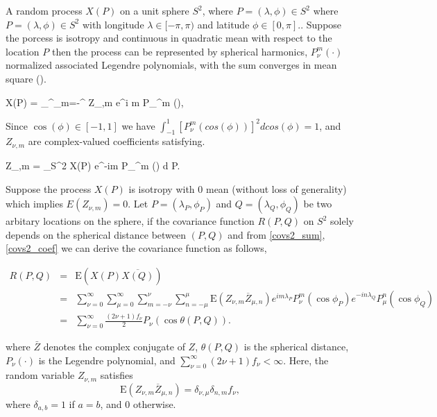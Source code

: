 	A random process $X(P)$ on a unit sphere $S^2$, where $P=(\lambda, \phi) \in S^2$ where $P=(\lambda, \phi) \in S^2$ with longitude $\lambda \in [-\pi, \pi)$ and latitude $\phi \in [0, \pi]$.. Suppose the porcess is isotropy and continuous in quadratic mean with respect to the location $P$ then the process can be represented by spherical harmonics, $P_{\nu}^m(\cdot)$ normalized associated Legendre polynomials, with the sum converges in mean square (\cite{LiNorth1997, Huang2012}).   
		
		\beq
		X(P) = \sum_{}^\infty \sum_{m=-\nu}^{\nu} Z_{\nu,m} e^{i m \lambda} P_{\nu}^m (\cos \phi),
		\eeq
		
		Since $\cos(\phi)\in[-1,1]$ we have $\int_{-1}^{1}[P_{\nu}^m(cos(\phi))]^2dcos(\phi) = 1$, and $Z_{\nu,m}$ are complex-valued coefficients satisfying.
		
		\beq
		Z_{\nu,m} = \int_{S^2} X(P) e^{-im \lambda} P_{\nu}^m (\cos \phi) d P.
		\eeq
			
		Suppose the process $X(P)$ is isotropy with 0 mean (without loss of generality) which implies $E(Z_{\nu,m}) = 0$. Let $P = (\lambda_P, \phi_P)$ and $Q=(\lambda_Q, \phi_Q)$ be two arbitary locations on the sphere, if the covariance function $R(P,Q)$ on $S^2$ solely depends on the spherical distance between $(P,Q)$ and from \ref{covs2_sum}, \ref{covs2_coef} we can derive the covariance function as follows,
			
		\begin{eqnarray} \label{rpq_1}
			R(P, Q) &=& \mbox{E}(X(P) \overline{X(Q)}) \nonumber \\
			&=& \sum_{\nu=0}^\infty \sum_{\mu=0}^\infty \sum_{m=-\nu}^{\nu} \sum_{n=-\mu}^{\mu} \mbox{E}(Z_{\nu,m} \overline{Z}_{\mu,n}) e^{im \lambda_P} P_{\nu}^m(\cos \phi_P) e^{-i n \lambda_Q} P_{\mu}^n (\cos \phi_Q) \nonumber \\
			&=& \sum_{\nu=0}^\infty \frac{(2\nu+1)f_{\nu}}{2} P_{\nu}(\cos \theta(P,Q)).
		\end{eqnarray}
			
		where $\bar{Z}$ denotes the complex conjugate of $Z$, $\theta(P,Q)$ is the spherical distance, $P_{\nu}(\cdot)$ is the Legendre polynomial, and $\sum_{\nu = 0}^{\infty} (2\nu+1)f_{\nu} < \infty$. Here, the random variable $Z_{\nu,m}$ satisfies
		\[
			\mbox{E} (Z_{\nu,m} \overline{Z}_{\mu,n}) = \delta_{\nu,\mu} \delta_{n,m} f_\nu,
		\]
		where $\delta_{a, b} = 1$ if $a = b$, and $0$ otherwise.
		
		
